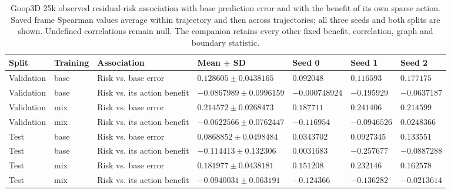 \begin{table}[p]
\centering\scriptsize
\caption{Goop3D 25k observed residual-risk association with base prediction error and with the benefit of its own sparse action. Saved frame Spearman values average within trajectory and then across trajectories; all three seeds and both splits are shown. Undefined correlations remain null. The companion retains every other fixed benefit, correlation, graph and boundary statistic.}
\label{tab:goop3d25k-observed-risk-correlations}
\setlength{\tabcolsep}{3pt}
\begin{tabular}{lllllll}
\toprule
Split & Training & Association & Mean $\pm$ SD & Seed 0 & Seed 1 & Seed 2\\
\midrule
Validation & base & Risk vs. base error & $0.128605\pm0.0438165$ & $0.092048$ & $0.116593$ & $0.177175$\\
Validation & base & Risk vs. its action benefit & $-0.0867989\pm0.0996159$ & $-0.000748924$ & $-0.195929$ & $-0.0637187$\\
Validation & mix & Risk vs. base error & $0.214572\pm0.0268473$ & $0.187711$ & $0.241406$ & $0.214599$\\
Validation & mix & Risk vs. its action benefit & $-0.0622566\pm0.0762447$ & $-0.116954$ & $-0.0946526$ & $0.0248366$\\
Test & base & Risk vs. base error & $0.0868852\pm0.0498484$ & $0.0343702$ & $0.0927345$ & $0.133551$\\
Test & base & Risk vs. its action benefit & $-0.114413\pm0.132306$ & $0.0031683$ & $-0.257677$ & $-0.0887288$\\
Test & mix & Risk vs. base error & $0.181977\pm0.0438181$ & $0.151208$ & $0.232146$ & $0.162578$\\
Test & mix & Risk vs. its action benefit & $-0.0940031\pm0.063191$ & $-0.124366$ & $-0.136282$ & $-0.0213614$\\
\bottomrule
\end{tabular}
\end{table}
